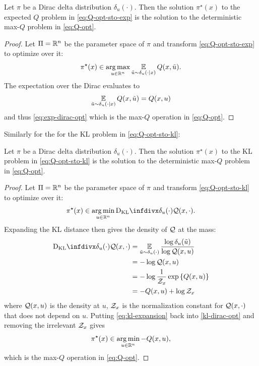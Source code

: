\documentclass[twoside,11pt]{article}
\begin{document}
\begin{proposition}
  Let $\pi$ be a Dirac delta distribution $\delta_u(\cdot)$.
  Then the solution $\pi^\star(x)$ to the expected $Q$ problem in
  \cref{eq:Q-opt-sto-exp} is the solution to the deterministic
  max-$Q$ problem in \cref{eq:Q-opt}.
\end{proposition}

\begin{proof}
  Let $\Pi=\mathbb{R}^n$ be the parameter space of $\pi$ and transform
  \cref{eq:Q-opt-sto-exp} to optimize over it:
  \begin{equation}
  \pi^\star(x) \in \operatorname*{arg\,max}_{u\in\mathbb{R}^n} \operatorname*{\mathbb{E}}_{\tilde u\sim\delta_u(\cdot\mid x)}{Q(x, \tilde u)}.
  \label{eq:exp-dirac-opt}
  \end{equation}
  The expectation over the Dirac evaluates to
  \begin{equation}
    \operatorname*{\mathbb{E}}_{\tilde u\sim\delta_u(\cdot\mid x)}{Q(x, \tilde u)} = Q(x,u)
    \label{eq:exp-expansion}
  \end{equation}
  and thus \cref{eq:exp-dirac-opt}
  which is the max-$Q$ operation in \cref{eq:Q-opt}.
\end{proof}

\noindent Similarly for the for the KL problem in \cref{eq:Q-opt-sto-kl}:
\begin{proposition}
  Let $\pi$ be a Dirac delta distribution $\delta_u(\cdot)$.
  Then the solution $\pi^\star(x)$ to the KL problem in
  \cref{eq:Q-opt-sto-kl} is the solution to the deterministic
  max-$Q$ problem in \cref{eq:Q-opt}.
\end{proposition}

\begin{proof}
  Let $\Pi=\mathbb{R}^n$ be the parameter space of $\pi$ and transform
  \cref{eq:Q-opt-sto-kl} to optimize over it:
  \begin{equation}
  \pi^\star(x) \in \argmin_{u\in\R^n} \kl{\delta_u(\cdot)}{\gQ(x, \cdot)}.
  \label{kl-dirac-opt}
  \end{equation}
  Expanding the KL distance then gives the density of ${\mathcal{Q}}$ at the mass:
  \begin{equation}
    \begin{aligned}
      \kl{\delta_u(\cdot)}{\gQ(x, \cdot)}
      & = \E_{\tilde u\sim \delta_u(\cdot)} \frac{\log{\delta_u(\tilde u)}}{\log \gQ(x,u)} \\
      & = -\log \gQ(x,u) \\
      & = -\log \frac{1}{\gZ_x}\exp\left\{Q(x,u)\right\} \\
      & = -Q(x, u) + \log \gZ_x \\
    \end{aligned}
    \label{eq:kl-expansion}
  \end{equation}
  where ${\mathcal{Q}}(x,u)$ is the density at $u$, ${\mathcal{Z}}_x$ is the
  normalization constant for ${\mathcal{Q}}(x,\cdot)$ that does not depend
  on $u$. Putting \cref{eq:kl-expansion} back into
  \cref{kl-dirac-opt} and removing the irrelevant ${\mathcal{Z}}_x$ gives
  \begin{equation}
  \pi^\star(x)\in \operatorname*{arg\,min}_{u\in\mathbb{R}^n} -Q(x,u),
  \end{equation}
  which is the max-$Q$ operation in \cref{eq:Q-opt}.
\end{proof}
\end{document}
